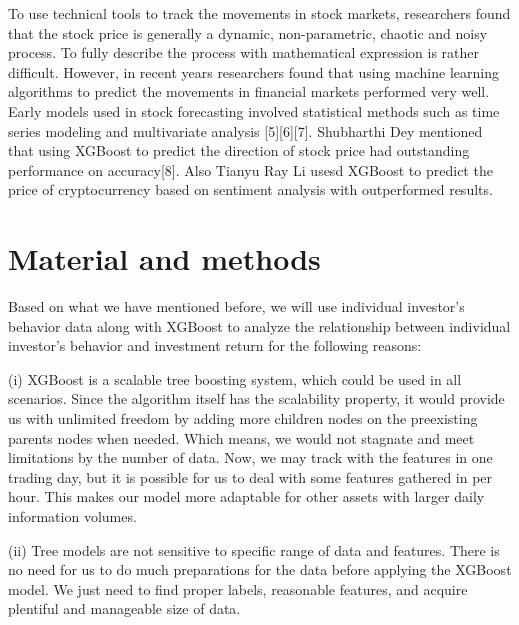 \documentclass[letterpaper]{article}
\begin{document}
To use technical tools to track the movements in stock markets, researchers found that the stock price is generally a dynamic, non-parametric, chaotic and noisy process. To fully describe the process with mathematical expression is rather difficult. However, in recent years researchers found that using machine learning algorithms to predict the movements in financial markets performed very well. Early models used in stock forecasting involved statistical methods such as time series modeling and multivariate analysis [5][6][7]. Shubharthi Dey mentioned that using XGBoost to predict the direction of stock price had outstanding performance on accuracy[8]. Also Tianyu Ray Li usesd XGBoost to predict the price of cryptocurrency based on sentiment analysis with outperformed results.




\section{Material and methods}
\label{material_method}
Based on what we have mentioned before, we will use individual investor's behavior data along with XGBoost to analyze the relationship between individual investor's behavior and investment return for the following reasons:

(i) XGBoost is a scalable tree boosting system, which could be used in all scenarios. Since the algorithm itself has the scalability property, it would provide us with unlimited freedom by adding more children nodes on the preexisting parents nodes when needed. Which means, we would not stagnate and meet limitations by the number of data. Now, we may track with the features in one trading day, but it is possible for us to deal with some features gathered in per hour. This makes our model more adaptable for other assets with larger daily information volumes. 

(ii) Tree models are not sensitive to specific range of data and features. There is no need for us to do much preparations for the data before applying the XGBoost model. We just need to find proper labels, reasonable features, and acquire plentiful and manageable size of data. 
\end{document}
